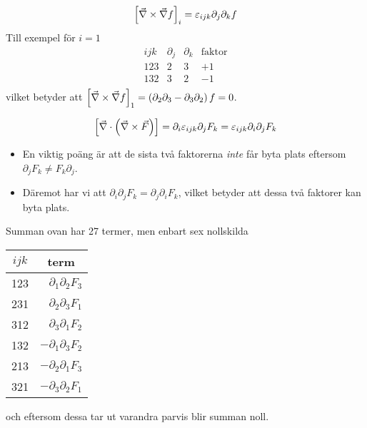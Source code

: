 \documentclass[%
oneside,                 %
final,                   %
10pt]{article}
\newenvironment{notice_mdfboxadmon}[1][]{
\begin{notice_mdfboxmdframed}[frametitle=#1]
}
{
\end{notice_mdfboxmdframed}
}
\begin{document}
\begin{notice_mdfboxadmon}
\begin{equation}
  \left[ \vec{\nabla} \times \vec{\nabla} f \right]_i = \varepsilon_{ijk} \partial_j \partial_k f
\end{equation}
Till exempel för $i=1$
\begin{equation}
  \begin{array}{llll}
  	ijk & \partial_j & \partial_k & \mathrm{faktor} \\
  	123 & 2 & 3 & +1 \\
  	132 & 3 & 2 & -1 \\
  \end{array}
\end{equation}
vilket betyder att $\left[ \vec{\nabla} \times \vec{\nabla} f \right]_1 = \left( \partial_2\partial_3 - \partial_3\partial_2 \right) f = 0$.
\end{notice_mdfboxadmon} %




\begin{notice_mdfboxadmon}
\begin{equation}
  \left[ \vec{\nabla} \cdot \left( \vec{\nabla} \times \vec{F} \right) \right] = \partial_i \varepsilon_{ijk} \partial_j F_k = \varepsilon_{ijk} \partial_i \partial_j F_k
\end{equation}
\begin{itemize}
\item En viktig poäng är att de sista två faktorerna \emph{inte} får byta plats eftersom $\partial_j F_k \neq F_k \partial_j$.

\item Däremot har vi att $\partial_i \partial_j F_k = \partial_j \partial_i F_k$, vilket betyder att dessa två faktorer kan byta plats.
\end{itemize}

\noindent
Summan ovan har 27 termer, men enbart sex nollskilda


\begin{tabular}{cr}
\hline
\multicolumn{1}{c}{ $ijk$ } & \multicolumn{1}{c}{ term } \\
\hline
123   & $\partial_1 \partial_2 F_3$  \\
231   & $\partial_2 \partial_3 F_1$  \\
312   & $\partial_3 \partial_1 F_2$  \\
132   & $-\partial_1 \partial_3 F_2$ \\
213   & $-\partial_2 \partial_1 F_3$ \\
321   & $-\partial_3 \partial_2 F_1$ \\
\hline
\end{tabular}


\noindent
och eftersom dessa tar ut varandra parvis blir summan noll.
\end{notice_mdfboxadmon} %
\end{document}
